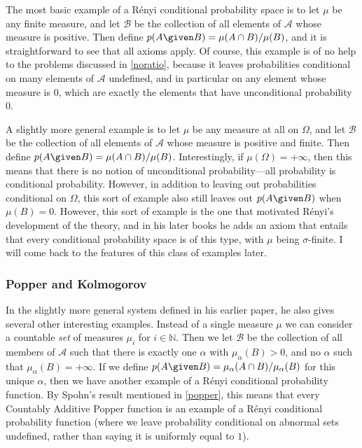 The most basic example of a R\'{e}nyi conditional probability space is to let $\mu$ be any finite measure, and let $\mathcal{B}$ be the collection of all elements of $\mathcal{A}$ whose measure is positive. Then define $p(A \given B)=\mu(A\cap B)/\mu(B)$, and it is straightforward to see that all axioms apply. Of course, this example is of no help to the problems discussed in \autoref{noratio}, because it leaves probabilities conditional on many elements of $\mathcal{A}$ undefined, and in particular on any element whose measure is $0$, which are exactly the elements that have unconditional probability $0$.

A slightly more general example is to let $\mu$ be any measure at all on $\Omega$, and let $\mathcal{B}$ be the collection of all elements of $\mathcal{A}$ whose measure is positive and finite. Then define $p(A \given B)=\mu(A\cap B)/\mu(B)$. Interestingly, if $\mu(\Omega)=+\infty$, then this means that there is no notion of unconditional probability---all probability is conditional probability. However, in addition to leaving out probabilities conditional on $\Omega$, this sort of example also still leaves out $p(A \given B)$ when $\mu(B)=0$. However, this sort of example is the one that motivated R\'{e}nyi's development of the theory, and in his later books he adds an axiom that entails that every conditional probability space is of this type, with $\mu$ being $\sigma$-finite. I will come back to the features of this class of examples later.

\subsubsection{Popper and Kolmogorov}

In the slightly more general system defined in his earlier paper, he also gives several other interesting examples. Instead of a single measure $\mu$ we can consider a countable \emph{set} of measures $\mu_i$ for $i\in\mathbb{N}$. Then we let $\mathcal{B}$ be the collection of all members of $\mathcal{A}$ such that there is exactly one $\alpha$ with $\mu_\alpha(B)>0$, and no $\alpha$ such that $\mu_\alpha(B)=+\infty$. If we define $p(A \given B)=\mu_\alpha(A\cap B)/\mu_\alpha(B)$ for this unique $\alpha$, then we have another example of a R\'{e}nyi conditional probability function. By Spohn's result mentioned in \autoref{popper}, this means that every Countably Additive Popper function is an example of a R\'{e}nyi conditional probability function (where we leave probability conditional on abnormal sets undefined, rather than saying it is uniformly equal to $1$).

